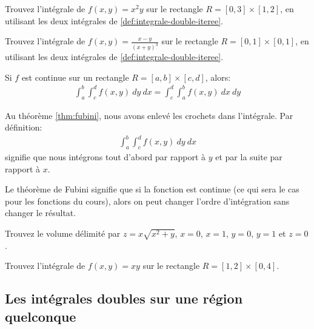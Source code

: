 \documentclass[]{book}
\theoremstyle{definition}
\theoremstyle{definition}
\theoremstyle{definition}
\theoremstyle{remark}
\let\BeginKnitrBlock\begin \let\EndKnitrBlock\end
\begin{document}
\BeginKnitrBlock{example}
\protect\hypertarget{exm:unnamed-chunk-241}{}{\label{exm:unnamed-chunk-241}
}Trouvez l'intégrale de \(f(x,y)=x^2y\) sur le rectangle
\(R=[0,3]\times[1,2]\), en utilisant les deux intégrales de
\ref{def:integrale-double-iteree}.
\EndKnitrBlock{example}
\vspace*{8cm}

\BeginKnitrBlock{example}
\protect\hypertarget{exm:unnamed-chunk-242}{}{\label{exm:unnamed-chunk-242}
}Trouvez l'intégrale de \(f(x,y)=\frac{x-y}{(x+y)^3}\) sur le rectangle
\(R=[0,1]\times[0,1]\), en utilisant les deux intégrales de
\ref{def:integrale-double-iteree}.
\EndKnitrBlock{example}
\vspace*{8cm}

\BeginKnitrBlock{theorem}[Fubini]
\protect\hypertarget{thm:fubini}{}{\label{thm:fubini} {} }Si \(f\) est continue sur un rectangle \(R=[a,b]\times[c,d]\),
alors: \begin{align*}
\int_a^b\int_c^df(x,y)\ dy\ dx=\int_c^d\int_a^bf(x,y)\ dx\ dy
\end{align*}
\EndKnitrBlock{theorem}

Au théorème \ref{thm:fubini}, nous avons enlevé les crochets dans
l'intégrale. Par définition: \begin{align*}
\int_a^b\int_c^df(x,y)\ dy\ dx
\end{align*} signifie que nous intégrons tout d'abord par rapport à
\(y\) et par la suite par rapport à \(x\).

Le théorème de Fubini signifie que si la fonction est continue (ce qui
sera le cas pour les fonctions du cours), alors on peut changer l'ordre
d'intégration sans changer le résultat. \BeginKnitrBlock{example}

\protect\hypertarget{exm:unnamed-chunk-243}{}{\label{exm:unnamed-chunk-243}
}Trouvez le volume délimité par \(z=x\sqrt{x^2+y}\), \(x=0\), \(x=1\),
\(y=0\), \(y=1\) et \(z=0\).
\EndKnitrBlock{example}
\vspace*{8cm}

\BeginKnitrBlock{example}
\protect\hypertarget{exm:unnamed-chunk-244}{}{\label{exm:unnamed-chunk-244}
}Trouvez l'intégrale de \(f(x,y)=xy\) sur le rectangle
\(R=[1,2]\times[0,4]\).
\EndKnitrBlock{example}
\vspace*{8cm}

\hypertarget{les-integrales-doubles-sur-une-region-quelconque}{%
\subsection{Les intégrales doubles sur une région
quelconque}\label{les-integrales-doubles-sur-une-region-quelconque}}
\end{document}
